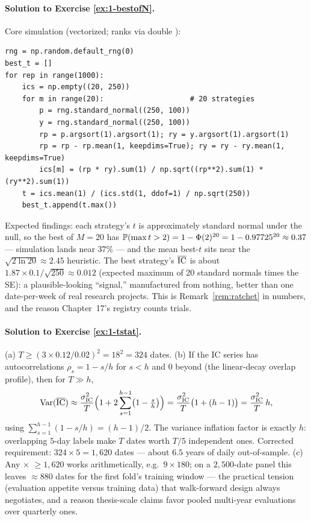 \paragraph{Solution to Exercise \ref{ex:1-bestofN}.}
Core simulation (vectorized; ranks via double ):

\begin{lstlisting}
rng = np.random.default_rng(0)
best_t = []
for rep in range(1000):
    ics = np.empty((20, 250))
    for m in range(20):                    # 20 strategies
        p = rng.standard_normal((250, 100))
        y = rng.standard_normal((250, 100))
        rp = p.argsort(1).argsort(1); ry = y.argsort(1).argsort(1)
        rp = rp - rp.mean(1, keepdims=True); ry = ry - ry.mean(1, keepdims=True)
        ics[m] = (rp * ry).sum(1) / np.sqrt((rp**2).sum(1) * (ry**2).sum(1))
    t = ics.mean(1) / (ics.std(1, ddof=1) / np.sqrt(250))
    best_t.append(t.max())
\end{lstlisting}

Expected findings: each strategy's $t$ is approximately standard normal
under the null, so the best of $M = 20$ has
$\mathbb{P}(\max t > 2) = 1 - \Phi(2)^{20} = 1 - 0.97725^{20} \approx 0.37$ ---
simulation lands near $37\%$ --- and the mean best-$t$ sits near the
$\sqrt{2\ln 20} \approx 2.45$ heuristic. The best strategy's $\overline{\mathrm{IC}}$ is
about $1.87 \times 0.1/\sqrt{250} \approx 0.012$ (expected maximum of 20
standard normals times the SE): a plausible-looking ``signal,''
manufactured from nothing, better than one date-per-week of real research
projects. This is Remark~\ref{rem:ratchet} in numbers, and the reason
Chapter~17's registry counts trials.

\paragraph{Solution to Exercise \ref{ex:1-tstat}.}
(a) $T \ge (3 \times 0.12/0.02)^2 = 18^2 = 324$ dates. (b) If the IC series
has autocorrelations $\rho_s = 1 - s/h$ for $s < h$ and $0$ beyond
(the linear-decay overlap profile), then for $T \gg h$,
\[
  \operatorname{Var}(\overline{\mathrm{IC}}) \approx \frac{\sigma_{\mathrm{IC}}^2}{T}
  \Bigl(1 + 2\sum_{s=1}^{h-1}\bigl(1 - \tfrac{s}{h}\bigr)\Bigr)
  = \frac{\sigma_{\mathrm{IC}}^2}{T}\bigl(1 + (h-1)\bigr)
  = \frac{\sigma_{\mathrm{IC}}^2}{T}\, h,
\]
using $\sum_{s=1}^{h-1}(1-s/h) = (h-1)/2$. The variance inflation factor is
exactly $h$: overlapping $5$-day labels make $T$ dates worth $T/5$
independent ones. Corrected requirement: $324 \times 5 = 1{,}620$ dates ---
about $6.5$ years of daily out-of-sample. (c) Any
 $\times$  $\ge 1{,}620$ works
arithmetically, e.g.\ $9 \times 180$; on a $2{,}500$-date panel this leaves
$\approx 880$ dates for the first fold's training window --- the practical
tension (evaluation appetite versus training data) that walk-forward design
always negotiates, and a reason thesis-scale claims favor pooled multi-year
evaluations over quarterly ones.

